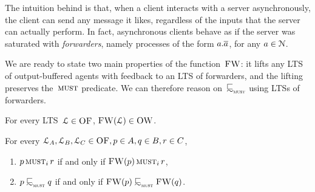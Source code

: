 The intuition behind  %
is that, when a client interacts with a server asynchronously, the
client can send any message it likes, regardless of the inputs that
the server can actually perform. In fact, asynchronous clients behave
as if the server was saturated with \emph{forwarders}, namely
processes of the form $a. \overline{a}$, for any $a\in\mathcal{N}$.


\noindent
We are ready to state two main properties of the
function~$\textsc{FW}$: it lifts any LTS of output-buffered agents with feedback
to an LTS of forwarders, and the lifting preserves the~$\operatorname{\textsc{must}}$ predicate. We can therefore
reason on~$\testleqS$ using LTSs of forwarders.%

\begin{lemma}
  \label{lem:liftFW-works}
  For every LTS~$\mathcal{L} \in \textsc{OF}$, $\textsc{FW}(\mathcal{L}) \in \textsc{OW}$.
\end{lemma}


\begin{lemma}
  \label{lem:musti-obafb-iff-musti-obafw}
  For every $\mathcal{L}_A, \mathcal{L}_B, \mathcal{L}_C \in \textsc{OF}, p \in A, q \in B, r \in C$,
  \begin{enumerate}
    \item
      $p \operatorname{\textsc{must}}_i r$ if and only if $\textsc{FW}(p) \operatorname{\textsc{must}}_i r$,
    \item
      $\serverA \testleqS \serverB$ if and only if $\liftFW{\serverA} \testleqS \liftFW{\serverB}$.
  \end{enumerate}
\end{lemma}






